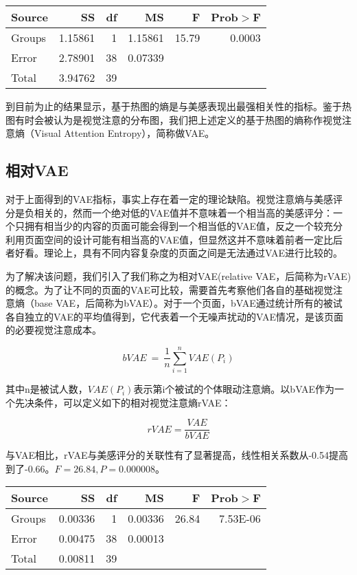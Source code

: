 \begin{table}[H]
\centering
\begin{tabular}{lrrrrr}
  \hline
  Source&SS&df&MS&F&Prob$>$F\\ \hline
  Groups&1.15861&1&1.15861&15.79&0.0003\\
  Error&2.78901&38&0.07339&&\\
  Total&3.94762&39&&&\\
  \hline
\end{tabular}
\end{table}

到目前为止的结果显示，基于热图的熵是与美感表现出最强相关性的指标。鉴于热图有时会被认为是视觉注意的分布图，我们把上述定义的基于热图的熵称作视觉注意熵（Visual Attention Entropy），简称做VAE。

\subsection{相对VAE}
对于上面得到的VAE指标，事实上存在着一定的理论缺陷。视觉注意熵与美感评分是负相关的，然而一个绝对低的VAE值并不意味着一个相当高的美感评分：一个只拥有相当少的内容的页面可能会得到一个相当低的VAE值，反之一个较充分利用页面空间的设计可能有相当高的VAE值，但显然这并不意味着前者一定比后者好看。理论上，具有不同内容复杂度的页面之间是无法通过VAE进行比较的。

为了解决该问题，我们引入了我们称之为相对VAE(relative VAE，后简称为rVAE)的概念。为了让不同的页面的VAE可比较，需要首先考察他们各自的基础视觉注意熵（base VAE，后简称为bVAE）。对于一个页面，bVAE通过统计所有的被试各自独立的VAE的平均值得到，它代表着一个无噪声扰动的VAE情况，是该页面的必要视觉注意成本。

$$bVAE~=~\frac{1}{n}\sum_{i=1}^n VAE(P_i)$$

其中n是被试人数，$VAE(P_i)$表示第i个被试的个体眼动注意熵。以bVAE作为一个先决条件，可以定义如下的相对视觉注意熵rVAE：

\begin{equation}
rVAE = \frac{VAE}{bVAE}
\label{formula:rvae}
\end{equation}

与VAE相比，rVAE与美感评分的关联性有了显著提高，线性相关系数从-0.54提高到了-0.66。$F = 26.84, P = 0.000008$。

\begin{table}[H]
\centering
\begin{tabular}{lrrrrr}
  \hline
  Source&SS&df&MS&F&Prob$>$F\\ \hline
  Groups&0.00336&1&0.00336&26.84&7.53E-06\\
  Error&0.00475&38&0.00013&&\\
  Total&0.00811&39&&&\\
  \hline
\end{tabular}
\end{table}

